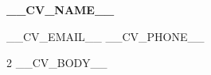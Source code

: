 \documentclass[UTF8, 10pt, a4paper]{ctexart}
\begin{document}
{\centering
  {\large\bfseries __CV_NAME__}\par
  \vspace{2pt}
  {\footnotesize __CV_EMAIL__ \quad\textbullet\quad __CV_PHONE__}\par
  \vspace{4pt}
  \textcolor{cvblue}{\titlerule[0.8pt]}\par
  \vspace{4pt}
}

\begin{multicols}{2}
__CV_BODY__
\end{multicols}
\end{document}
